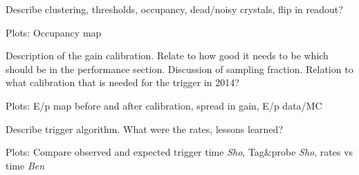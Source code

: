 
\vspace{1cm}{\bf ECal performance [Sho]}


Describe clustering, thresholds, occupancy, dead/noisy crystals, flip in readout?

Plots: Occupancy map

\vspace{1cm}{\bf ECal Calibration [Sho]}


Description of the gain calibration. Relate to how good it needs to be which should be in the performance section. Discussion of sampling fraction. Relation to what calibration that is needed for the trigger in 2014?

Plots: E/p map before and after calibration, spread in gain, E/p data/MC


\vspace{1cm}{\bf Trigger performance [Sho/Ben]}


Describe trigger algorithm. What were the rates, lessons learned?

Plots: Compare observed and expected trigger time {\it Sho}, Tag\&probe {\it Sho}, rates vs time {\it Ben}


